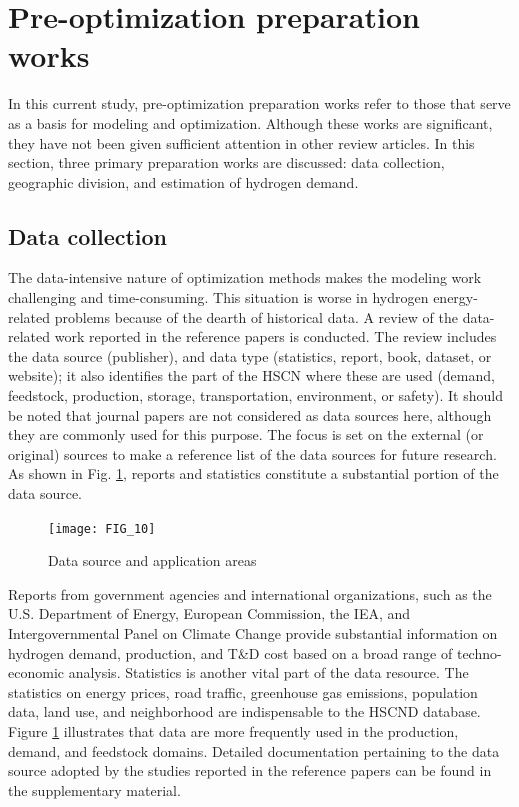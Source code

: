 \documentclass[11pt,3p]{elsarticle}
\begin{document}
\section{Pre-optimization preparation works}
\label{sec:pre-optimi}

In this current study, pre-optimization preparation works refer to those that serve as a basis for modeling and optimization. Although these works are significant, they have not been given sufficient attention in other review articles. In this section, three primary preparation works are discussed: data collection, geographic division, and estimation of hydrogen demand.

\subsection{Data collection}

The data-intensive nature of optimization methods makes the modeling work challenging and time-consuming. This situation is worse in hydrogen energy-related problems because of the dearth of historical data. A review of the data-related work reported in the reference papers is conducted. The review includes the data source (publisher), and data type (statistics, report, book, dataset, or website); it also identifies the part of the HSCN where these are used (demand, feedstock, production, storage, transportation, environment, or safety). It should be noted that journal papers are not considered as data sources here, although they are commonly used for this purpose. The focus is set on the external (or original) sources to make a reference list of the data sources for future research. As shown in Fig. \ref{fig:DataSourceApplicationArea}, reports and statistics constitute a substantial portion of the data source. 

\begin{figure}[!htbp]
\centering
\texttt{[image: FIG\_10]}
\caption{\label{fig:DataSourceApplicationArea}Data source and application areas}
\end{figure}

Reports from government agencies and international organizations, such as the U.S. Department of Energy, European Commission, the IEA, and Intergovernmental Panel on Climate Change provide substantial information on hydrogen demand, production, and T\&D cost based on a broad range of techno-economic analysis. Statistics is another vital part of the data resource. The statistics on energy prices, road traffic, greenhouse gas emissions, population data, land use, and neighborhood are indispensable to the HSCND database. Figure \ref{fig:DataSourceApplicationArea} illustrates that data are more frequently used in the production, demand, and feedstock domains. Detailed documentation pertaining to the data source adopted by the studies reported in the reference papers can be found in the supplementary material.
\end{document}
